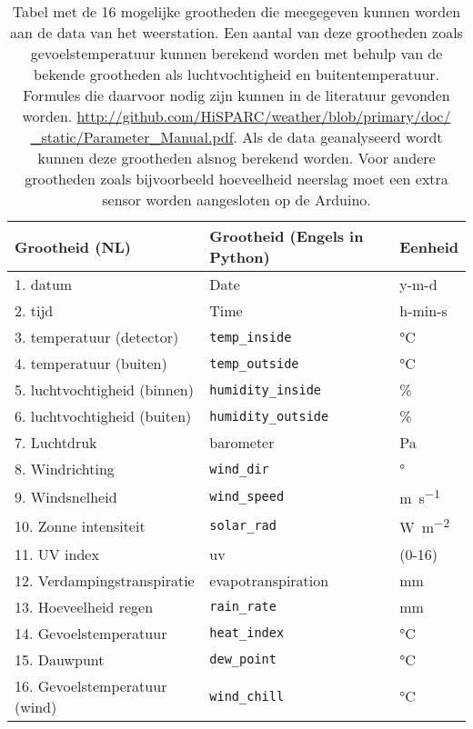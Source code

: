 \begin{table}
    \centering
    \begin{tabular}{ | l | l | l |}
        \hline
        \textbf{Grootheid (NL)} & \textbf{Grootheid (Engels in Python)} & \textbf{Eenheid} \\ \hline
        1. datum & Date & y-m-d \\ \hline
        2. tijd & Time & h-min-s \\ \hline
        3. temperatuur (detector) & \verb|temp_inside| & \si{\celsius} \\ \hline
        4. temperatuur (buiten) & \verb|temp_outside| & \si{\celsius} \\ \hline
        5. luchtvochtigheid (binnen) & \verb|humidity_inside|& \si{\percent} \\ \hline
        6. luchtvochtigheid (buiten) & \verb|humidity_outside| & \si{\percent} \\ \hline
        7. Luchtdruk & barometer & \si{\pascal} \\ \hline
        8. Windrichting & \verb|wind_dir| & \si{\degree} \\ \hline
        9. Windsnelheid & \verb|wind_speed| & \si{\meter\per\second} \\ \hline
        10. Zonne intensiteit & \verb|solar_rad| & \si{\watt\per\square\meter} \\ \hline
        11. UV index & uv & (0-16) \\ \hline
        12. Verdampingstranspiratie & evapotranspiration & \si{\milli\meter} \\ \hline
        13. Hoeveelheid regen & \verb|rain_rate| & \si{\milli\meter} \\ \hline
        14. Gevoelstemperatuur & \verb|heat_index| & \si{\celsius} \\ \hline
        15. Dauwpunt & \verb|dew_point| & \si{\celsius} \\ \hline
        16. Gevoelstemperatuur (wind) & \verb|wind_chill| & \si{\celsius} \\ \hline
   \end{tabular}
   \caption{Tabel met de 16 mogelijke grootheden die meegegeven kunnen
            worden aan de data van het weerstation. Een aantal van deze
            grootheden zoals gevoelstemperatuur kunnen berekend worden met behulp
            van de bekende grootheden als luchtvochtigheid en buitentemperatuur.
            Formules die daarvoor nodig zijn kunnen in de literatuur gevonden
            worden.
            \protect\url{http://github.com/HiSPARC/weather/blob/primary/doc/
            _static/Parameter_Manual.pdf}. Als de data geanalyseerd wordt kunnen
            deze grootheden alsnog berekend worden. Voor andere grootheden zoals
            bijvoorbeeld hoeveelheid neerslag moet een extra sensor worden
            aangesloten op de Arduino.}
   \label{table:grootheden}
\end{table}


